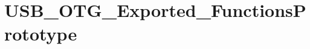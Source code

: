 \hypertarget{group___u_s_b___o_t_g___exported___functions_prototype}{\section{U\-S\-B\-\_\-\-O\-T\-G\-\_\-\-Exported\-\_\-\-Functions\-Prototype}
\label{group___u_s_b___o_t_g___exported___functions_prototype}
}
